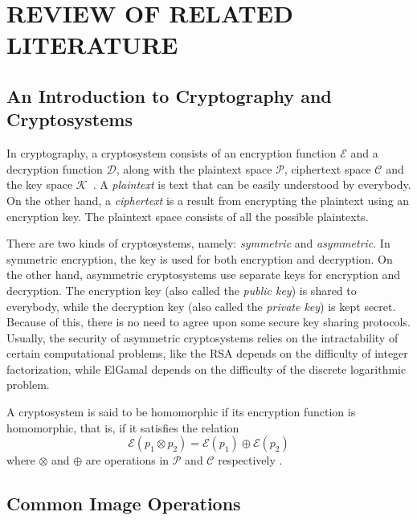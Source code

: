 \chapter{REVIEW OF RELATED LITERATURE}

\section{An Introduction to Cryptography and Cryptosystems}

In cryptography, a cryptosystem consists of an encryption function $\mathcal{E}$ and a decryption function $\mathcal{D}$, along with the plaintext space $\mathcal{P}$, ciphertext space $\mathcal{C}$ and the key space $\mathcal{K}$~\cite{tilborg_encyclopedia_2005}. A \textit{plaintext} is text that can be easily understood by everybody. On the other hand, a \textit{ciphertext} is a result from encrypting the plaintext using an encryption key. The plaintext space consists of all the possible plaintexts.

There are two kinds of cryptosystems, namely: \textit{symmetric} and \textit{asymmetric}. In symmetric encryption, the key is used for both encryption and decryption. On the other hand, asymmetric cryptosystems use separate keys for encryption and decryption. The encryption key (also called the \textit{public key}) is shared to everybody, while the decryption key (also called the \textit{private key}) is kept secret. Because of this, there is no need to agree upon some secure key sharing protocols. Usually, the security of asymmetric cryptosystems relies on the intractability of certain computational problems, like the RSA depends on the difficulty of integer factorization, while ElGamal depends on the difficulty of the discrete logarithmic problem.

A cryptosystem is said to be homomorphic if its encryption function is homomorphic, that is, if it satisfies the relation
\begin{equation}
    \mathcal{E}\left(p_1 \otimes p_2\right) = \mathcal{E}\left(p_1\right) \oplus \mathcal{E}\left(p_2\right)
\end{equation}
where $\otimes$ and $\oplus$ are operations in $\mathcal{P}$ and $\mathcal{C}$ respectively \cite{fontaine_survey_2007}.


\section{Common Image Operations}


